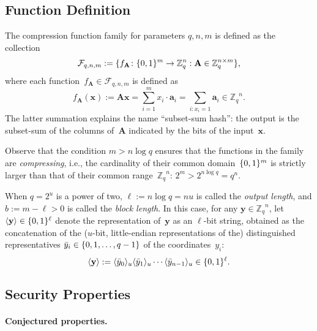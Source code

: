 \documentclass[11pt]{article}
\newcommand{\Z}{\ensuremath{\mathbb{Z}}}
\newcommand{\Zq}{\ensuremath{\Z_q}}
\DeclarePairedDelimiter\inner{\langle}{\rangle}
\DeclarePairedDelimiter\set{\{}{\}}
\newcommand{\matA}{\ensuremath{\mathbf{A}}}
\newcommand{\veca}{\ensuremath{\mathbf{a}}}
\newcommand{\vecx}{\ensuremath{\mathbf{x}}}
\newcommand{\vecy}{\ensuremath{\mathbf{y}}}
\numberwithin{equation}{section}
\newcommand{\bit}{\ensuremath{\set{0,1}}}
\renewcommand{\cal}[1]{\mathcal{#1}}
\begin{document}
\subsection{Function Definition}
\label{sec:function-definition}

The compression function family for parameters $q,n,m$ is defined as
the collection
\[ \cal F_{q,n,m} := \set{ f_{\matA} \colon \bit^{m} \to \Zq^{n} :
    \matA \in \Zq^{n \times m} } \text{,} \] where each
function~$f_{\matA} \in \cal F_{q,n,m}$ is defined as
\begin{equation}
  \label{eq:f_A}
  f_{\matA}(\vecx) := \matA \vecx = \sum_{i=1}^{m} x_{i} \cdot
  \veca_{i} = \sum_{i : x_{i}=1} \veca_{i} \in \Zq^{n} \text{.}
\end{equation}
The latter summation explains the name ``subset-sum hash'': the output
is the subset-sum of the columns of~$\matA$ indicated by the bits of
the input~$\vecx$.

Observe that the condition $m > n \log q$ ensures that the functions
in the family are \emph{compressing}, i.e., the cardinality of their
common domain~$\bit^{m}$ is strictly larger than that of their common
range~$\Zq^{n}$: $2^{m} > 2^{n \log q} = q^{n}$.

When $q = 2^{u}$ is a power of two, $\ell := n \log q = n u$ is called
the \emph{output length}, and $b := m - \ell > 0$ is called the
\emph{block length}. In this case, for any $\vecy \in \Zq^{n}$, let
$\inner{\vecy} \in \bit^{\ell}$ denote the representation of~$\vecy$
as an $\ell$-bit string, obtained as the concatenation of the
($u$-bit, little-endian representations of the) distinguished
representatives $\bar{y}_{i} \in \set{0, 1, \ldots, q-1}$ of the
coordinates~$y_{i}$:
\begin{equation}
  \label{eq:Zqn-rep}
  \inner{\vecy} := \inner{\bar{y}_{0}}_{u} \inner{\bar{y}_{1}}_{u}
  \cdots \inner{\bar{y}_{n-1}}_{u} \in \bit^{\ell} \text{.}
\end{equation}

\subsection{Security Properties}
\label{sec:security-properties}

\paragraph{Conjectured properties.}
\end{document}

